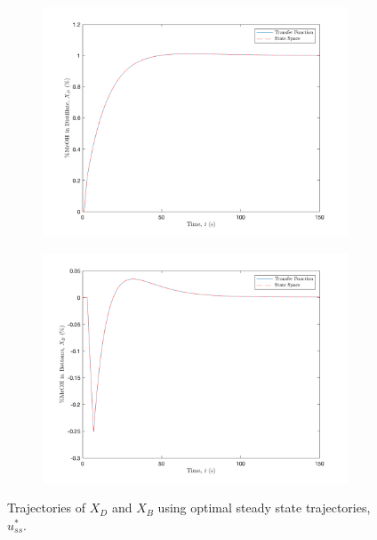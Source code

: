 \begin{figure}[h]
     \centering
     \begin{subfigure}[b]{0.48\textwidth}
         \centering
         \includegraphics[width=\textwidth]{images/optimal_ss_xd.png}
     \end{subfigure}
     \begin{subfigure}[b]{0.48\textwidth}
         \centering
         \includegraphics[width=\textwidth]{images/optimal_ss_xb.png}
     \end{subfigure}
     \caption{Trajectories of $X_D$ and $X_B$ using optimal steady state trajectories, $u_{ss}^*.$}
     \label{fig: optimal_ss_xd_xb}
\end{figure}

